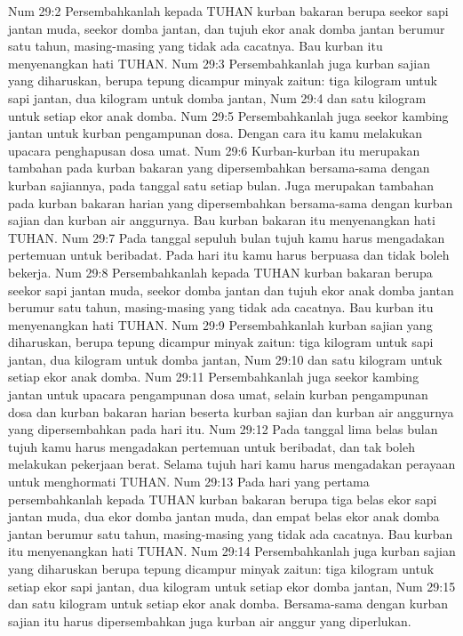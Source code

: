 Num 29:2  Persembahkanlah kepada TUHAN kurban bakaran berupa seekor sapi jantan muda, seekor domba jantan, dan tujuh ekor anak domba jantan berumur satu tahun, masing-masing yang tidak ada cacatnya. Bau kurban itu menyenangkan hati TUHAN.
Num 29:3  Persembahkanlah juga kurban sajian yang diharuskan, berupa tepung dicampur minyak zaitun: tiga kilogram untuk sapi jantan, dua kilogram untuk domba jantan,
Num 29:4  dan satu kilogram untuk setiap ekor anak domba.
Num 29:5  Persembahkanlah juga seekor kambing jantan untuk kurban pengampunan dosa. Dengan cara itu kamu melakukan upacara penghapusan dosa umat.
Num 29:6  Kurban-kurban itu merupakan tambahan pada kurban bakaran yang dipersembahkan bersama-sama dengan kurban sajiannya, pada tanggal satu setiap bulan. Juga merupakan tambahan pada kurban bakaran harian yang dipersembahkan bersama-sama dengan kurban sajian dan kurban air anggurnya. Bau kurban bakaran itu menyenangkan hati TUHAN.
Num 29:7  Pada tanggal sepuluh bulan tujuh kamu harus mengadakan pertemuan untuk beribadat. Pada hari itu kamu harus berpuasa dan tidak boleh bekerja.
Num 29:8  Persembahkanlah kepada TUHAN kurban bakaran berupa seekor sapi jantan muda, seekor domba jantan dan tujuh ekor anak domba jantan berumur satu tahun, masing-masing yang tidak ada cacatnya. Bau kurban itu menyenangkan hati TUHAN.
Num 29:9  Persembahkanlah kurban sajian yang diharuskan, berupa tepung dicampur minyak zaitun: tiga kilogram untuk sapi jantan, dua kilogram untuk domba jantan,
Num 29:10  dan satu kilogram untuk setiap ekor anak domba.
Num 29:11  Persembahkanlah juga seekor kambing jantan untuk upacara pengampunan dosa umat, selain kurban pengampunan dosa dan kurban bakaran harian beserta kurban sajian dan kurban air anggurnya yang dipersembahkan pada hari itu.
Num 29:12  Pada tanggal lima belas bulan tujuh kamu harus mengadakan pertemuan untuk beribadat, dan tak boleh melakukan pekerjaan berat. Selama tujuh hari kamu harus mengadakan perayaan untuk menghormati TUHAN.
Num 29:13  Pada hari yang pertama persembahkanlah kepada TUHAN kurban bakaran berupa tiga belas ekor sapi jantan muda, dua ekor domba jantan muda, dan empat belas ekor anak domba jantan berumur satu tahun, masing-masing yang tidak ada cacatnya. Bau kurban itu menyenangkan hati TUHAN.
Num 29:14  Persembahkanlah juga kurban sajian yang diharuskan berupa tepung dicampur minyak zaitun: tiga kilogram untuk setiap ekor sapi jantan, dua kilogram untuk setiap ekor domba jantan,
Num 29:15  dan satu kilogram untuk setiap ekor anak domba. Bersama-sama dengan kurban sajian itu harus dipersembahkan juga kurban air anggur yang diperlukan.
